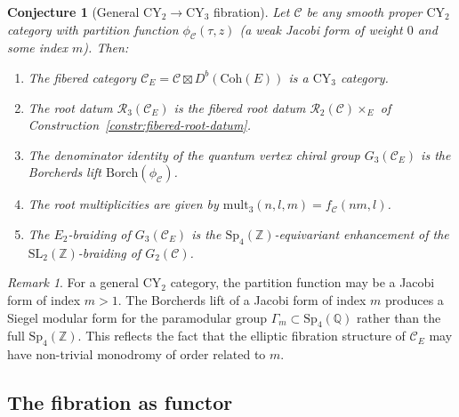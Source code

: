 \documentclass[11pt]{article}
\theoremstyle{plain}
\newtheorem{conjecture}[theorem]{Conjecture}
\theoremstyle{definition}
\theoremstyle{remark}
\newtheorem{remark}[theorem]{Remark}
\newcommand{\CY}{\mathrm{CY}}
\newcommand{\Coh}{\mathrm{Coh}}
\newcommand{\Etwo}{E_2}
\newcommand{\cC}{\mathcal{C}}
\newcommand{\cR}{\mathcal{R}}
\begin{document}
\begin{conjecture}[General $\CY_2 \to \CY_3$ fibration]
\label{conj:general-fibration}
Let $\cC$ be any smooth proper $\CY_2$ category with partition function
$\phi_\cC(\tau, z)$ (a weak Jacobi form of weight $0$ and some index $m$).
Then:
\begin{enumerate}[label=(\roman*)]
\item The fibered category $\cC_E = \cC \boxtimes D^b(\Coh(E))$ is a $\CY_3$
 category.

\item The root datum $\cR_3(\cC_E)$ is the fibered root datum
 $\cR_2(\cC) \times_E$ of Construction~\ref{constr:fibered-root-datum}.

\item The denominator identity of the quantum vertex chiral group
 $G_3(\cC_E)$ is the Borcherds lift $\mathrm{Borch}(\phi_\cC)$.

\item The root multiplicities are given by
 $\mathrm{mult}_3(n, l, m) = f_\cC(nm, l)$.

\item The $\Etwo$-braiding of $G_3(\cC_E)$ is the
 $\mathrm{Sp}_4(\mathbb{Z})$-equivariant enhancement of the
 $\mathrm{SL}_2(\mathbb{Z})$-braiding of $G_2(\cC)$.
\end{enumerate}
\end{conjecture}

\begin{remark}
\label{rmk:index-m-general}
For a general $\CY_2$ category, the partition function may be a Jacobi form of
index $m > 1$. The Borcherds lift of a Jacobi form of index $m$ produces a
Siegel modular form for the paramodular group $\Gamma_m \subset \mathrm{Sp}_4(\mathbb{Q})$
rather than the full $\mathrm{Sp}_4(\mathbb{Z})$. This reflects the fact that the
elliptic fibration structure of $\cC_E$ may have non-trivial monodromy of
order related to $m$.
\end{remark}

\subsection{The fibration as functor}
\label{subsec:fibration-functor}
\end{document}
